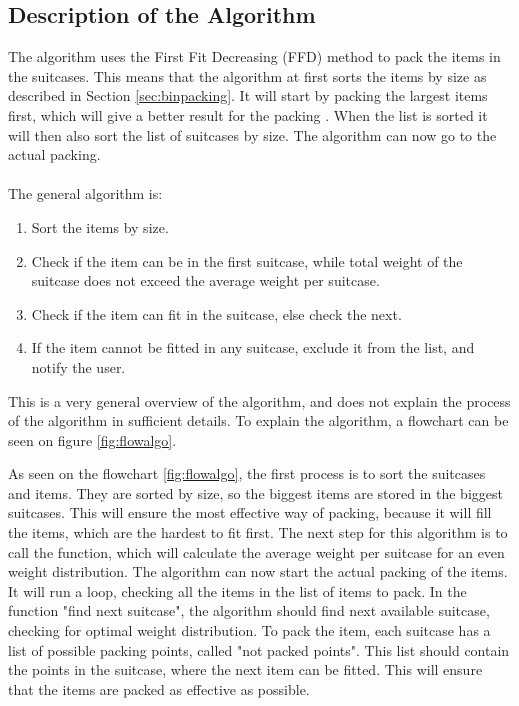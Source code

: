 \subsection{Description of the Algorithm}
The algorithm uses the First Fit Decreasing (FFD) method to pack the items in the suitcases. This means that the algorithm at first sorts the items by size as described in Section \ref{sec:binpacking}. It will start by packing the largest items first, which will give a better result for the packing \citep{binpackingsource}. When the list is sorted it will then also sort the list of suitcases by size. The algorithm can now go to the actual packing.\\
\\
The general algorithm is:
\begin{enumerate}
	\item Sort the items by size.
	\item Check if the item can be in the first suitcase, while total weight of the suitcase does not exceed the average weight per suitcase.
	\item Check if the item can fit in the suitcase, else check the next.
	\item If the item cannot be fitted in any suitcase, exclude it from the list, and notify the user.
\end{enumerate}

This is a very general overview of the algorithm, and does not explain the process of the algorithm in sufficient details. To explain the algorithm, a flowchart can be seen on figure \ref{fig:flowalgo}.


As seen on the flowchart \ref{fig:flowalgo}, the first process is to sort the suitcases and items. They are sorted by size, so the biggest items are stored in the biggest suitcases. This will ensure the most effective way of packing, because it will fill the items, which are the hardest to fit first. The next step for this algorithm is to call the function, which will calculate the average weight per suitcase for an even weight distribution. The algorithm can now start the actual packing of the items.
It will run a loop, checking all the items in the list of items to pack. In the function "find next suitcase", the algorithm should find next available suitcase, checking for optimal weight distribution. To pack the item, each suitcase has a list of possible packing points, called "not packed points". This list should contain the points in the suitcase, where the next item can be fitted. This will ensure that the items are packed as effective as possible.


